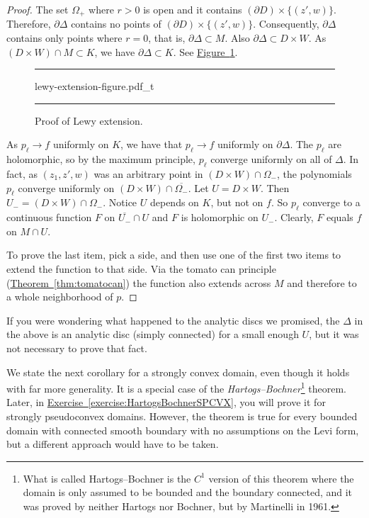 \documentclass[12pt,openany]{book}
\newcommand{\myindex}[1]{#1\index{#1}}
\theoremstyle{plain}
\theoremstyle{remark}
\theoremstyle{definition}
\newenvironment{myfig}{%
\begin{figure}[h!t]
\noindent\rule{\textwidth}{0.5pt}\vspace{12pt}\par\centering}%
{\par\noindent\rule{\textwidth}{0.5pt}
\end{figure}}
\theoremstyle{exercise}
\theoremstyle{example}
\newcommand{\figureref}[1]{\hyperref[#1]{Figure~\ref*{#1}}}
\newcommand{\exerciseref}[1]{\hyperref[#1]{Exercise~\ref*{#1}}}
\newcommand{\thmref}[1]{\hyperref[#1]{Theorem~\ref*{#1}}}
\begin{document}
\begin{proof}
The set $\Omega_+$ where $r > 0$ is open and it contains
$(\partial D) \times \{ (z',w) \}$.  Therefore,
$\partial \Delta$ contains no points of $(\partial D) \times \{ (z',w) \}$.
Consequently, $\partial \Delta$ contains only points where
$r = 0$, that is, $\partial \Delta \subset M$.
Also
$\partial \Delta \subset D \times W$.
As $(D \times W) \cap M \subset K$, we have $\partial \Delta \subset K$.
See \figureref{fig:lewy-extension-figure}.

\begin{myfig}
{lewy-extension-figure.pdf_t}
\caption{Proof of Lewy extension.\label{fig:lewy-extension-figure}}
\end{myfig}

As $p_\ell \to f$ uniformly on $K$, we have that $p_\ell \to f$ uniformly on
$\partial \Delta$.  The $p_\ell$ are holomorphic, so by the maximum
principle, $p_\ell$ converge uniformly on all of $\Delta$.  In fact, as $(z_1,z',w)$ was
an arbitrary point in $(D \times W) \cap \Omega_-$,
the polynomials $p_\ell$ converge uniformly on
$(D \times W) \cap \overline{\Omega_-}$.
Let $U = D \times W$.
Then $U_- = (D \times W) \cap \Omega_-$.
Notice $U$ depends on $K$, but not on $f$.
So $p_\ell$ converge to a continuous function $F$ on $\overline{U_-} \cap
U$ and $F$ is holomorphic on $U_-$.  Clearly, $F$ equals $f$ on $M \cap U$.

To prove the last item, pick a side, and then use one of the first two
items to extend the function to that side.  Via the tomato can
principle (\thmref{thm:tomatocan}) the function also extends across $M$ and
therefore to a whole neighborhood of $p$.
\end{proof}

If you were wondering what happened to the analytic discs we promised,
the $\Delta$ in the above is an analytic disc (simply connected) for a small enough $U$, but it was
not necessary to prove that fact.

We state the next corollary for a strongly convex domain, even though it
holds with far more generality.
It is a special case of the \emph{\myindex{Hartogs--Bochner}}\footnote{What is called
Hartogs--Bochner is
the $C^1$ version of this theorem where the domain is only assumed to be bounded
and the boundary connected,
and it was proved by neither Hartogs nor
Bochner, but by Martinelli in 1961.} theorem.
Later, in \exerciseref{exercise:HartogsBochnerSPCVX},
you will prove it for strongly pseudoconvex
domains.  However, the theorem is true for every bounded domain with connected smooth
boundary
with no assumptions on the Levi form, but
a different approach would have to be taken.
\end{document}
